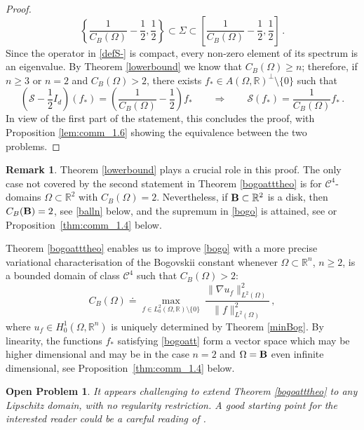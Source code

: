 \documentclass[11pt]{article}
\theoremstyle{plain}
\newtheorem{problem}{Open Problem}
\theoremstyle{definition}
\newtheorem{remark}[theorem]{Remark}
\numberwithin{equation}{section}
\newcommand{\R}{\mathbb{R}}
\newcommand{\B}{{\bf B}}
\begin{document}
\begin{proof}
\begin{equation}
	\left\{ \dfrac{1}{C_{B}(\Omega)} - \dfrac{1}{2}, \dfrac{1}{2} \right\} \subset \Sigma\subset\left[\dfrac{1}{C_{B}(\Omega)} - \dfrac{1}{2}, \dfrac{1}{2} \right]\, .
\end{equation}
Since the operator in \eqref{defS-} is compact, every non-zero element of its spectrum is an eigenvalue. By Theorem \ref{lowerbound} we know that $C_{B}(\Omega) \geq n$; therefore,
if $n \geq 3$ or $n=2$ and $C_{B}(\Omega) > 2$, there exists $f_{*} \in A(\Omega,\R)^{\perp} \setminus \{0\}$ such that
$$
\left(\mathcal{S} - \dfrac{1}{2} I_{d} \right)(f_{*}) = \left( \dfrac{1}{C_{B}(\Omega)} - \dfrac{1}{2} \right) f_{*} \qquad \Longrightarrow \qquad \mathcal{S}(f_{*}) = \dfrac{1}{C_{B}(\Omega)} f_{*} \, .
$$
In view of the first part of the statement, this concludes the proof, with Proposition \ref{lem:comm_1.6} showing the equivalence between
the two problems.\end{proof}

\begin{remark}
Theorem \ref{lowerbound} plays a crucial role in this proof. The only case not covered by the second statement in Theorem \ref{bogoatttheo}
is for $\mathcal{C}^{4}$-domains $\Omega\subset\mathbb{R}^2$ with $C_{B}(\Omega)=2$. Nevertheless, if $\B \subset \mathbb{R}^{2}$ is a disk,
then $C_{B}(\B)=2$, see \eqref{balln} below, and the supremum in \eqref{bogo} is attained, see \cite[Theorem 3]{gaultier1996spectral}
or Proposition~\ref{thm:comm_1.4} below.
\end{remark}

Theorem \ref{bogoatttheo} enables us to improve \eqref{bogo} with a more precise variational characterisation of the Bogovskii constant whenever $\Omega\subset\R^n$, $n \geq 2$, is a bounded domain of class $\mathcal{C}^{4}$ such that $C_{B}(\Omega) > 2$:
$$C_B(\Omega) \doteq \max_{f\in L^2_0(\Omega,\R) \setminus \{0\}} \ \dfrac{\| \nabla u_{f} \|_{L^2(\Omega)}^2}{\| f \|_{L^2(\Omega)}^2} \, ,$$
where $u_f\in H^1_0(\Omega,\R^n)$ is uniquely determined by Theorem \ref{minBog}.
By linearity, the functions $f_*$ satisfying \eqref{bogoatt} form a vector space which may 
be higher dimensional and may be in the case $n=2$ and $\Omega =\B$ even infinite dimensional, see
Proposition~\ref{thm:comm_1.4} below.

\begin{problem}\label{smooth_to_Lip}
It appears challenging to extend Theorem \ref{bogoatttheo} to any Lipschitz domain, with no regularity restriction. A good starting point for the interested reader could be
a careful reading of \cite{Bernardi}.
\end{problem}
\end{document}
